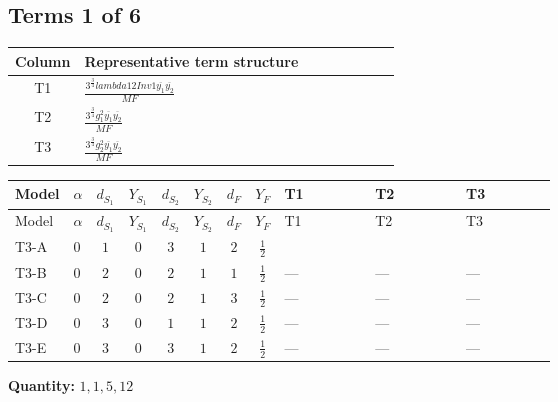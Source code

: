 \documentclass[8pt]{article}
\begin{document}
\begin{landscape}
\subsection*{Terms 1 of 6}
\begin{center}
\begin{tabular}{@{}c >{\raggedright\arraybackslash}p{0.82\linewidth}@{}}
\toprule
Column & Representative term structure \\
\midrule
T1 & \(\displaystyle \frac{3^{\frac{3}{4}} lambda12Inv1 \overline{y_{1}} \overline{y_{2}}}{MF}\) \\
\midrule
T2 & \(\displaystyle \frac{3^{\frac{3}{4}} g_{1}^{2} \overline{y_{1}} \overline{y_{2}}}{MF}\) \\
\midrule
T3 & \(\displaystyle \frac{3^{\frac{3}{4}} g_{2}^{2} \overline{y_{1}} \overline{y_{2}}}{MF}\) \\
\midrule
\bottomrule
\end{tabular}
\end{center}
\smallskip
\tiny
\begin{longtable}{@{}llcccccc >{\raggedright\arraybackslash}p{0.21\linewidth} >{\raggedright\arraybackslash}p{0.21\linewidth} >{\raggedright\arraybackslash}p{0.21\linewidth}@{}}
\toprule
Model & $\alpha$ & $d_{S_1}$ & $Y_{S_1}$ & $d_{S_2}$ & $Y_{S_2}$ & $d_F$ & $Y_F$ & T1 & T2 & T3 \\
\midrule
\endfirsthead
\toprule
Model & $\alpha$ & $d_{S_1}$ & $Y_{S_1}$ & $d_{S_2}$ & $Y_{S_2}$ & $d_F$ & $Y_F$ & T1 & T2 & T3 \\
\midrule
\endhead
T3-A & $0$ & $1$ & $0$ & $3$ & $1$ & $2$ & $\frac{1}{2}$ & \scriptsize\adjustbox{max width=\linewidth}{$\begin{gathered} \frac{3^{\frac{3}{4}} lambda12Inv1 \overline{y_{1}} \overline{y_{2}}}{6 MF}\end{gathered}$} & \scriptsize\adjustbox{max width=\linewidth}{$\begin{gathered} \frac{3^{\frac{3}{4}} g_{1}^{2} \overline{y_{1}} \overline{y_{2}}}{8 MF}\end{gathered}$} & \scriptsize\adjustbox{max width=\linewidth}{$\begin{gathered} \frac{17 \cdot 3^{\frac{3}{4}} g_{2}^{2} \overline{y_{1}} \overline{y_{2}}}{24 MF}\end{gathered}$} \\
\midrule
T3-B & $0$ & $2$ & $0$ & $2$ & $1$ & $1$ & $\frac{1}{2}$ & --- & --- & --- \\
\midrule
T3-C & $0$ & $2$ & $0$ & $2$ & $1$ & $3$ & $\frac{1}{2}$ & --- & --- & --- \\
\midrule
T3-D & $0$ & $3$ & $0$ & $1$ & $1$ & $2$ & $\frac{1}{2}$ & --- & --- & --- \\
\midrule
T3-E & $0$ & $3$ & $0$ & $3$ & $1$ & $2$ & $\frac{1}{2}$ & --- & --- & --- \\
\midrule
\bottomrule
\end{longtable}
\clearpage
\noindent\textbf{Quantity: }$\mathrm{1,1,5,12}$\par\smallskip

\end{landscape}
\end{document}
